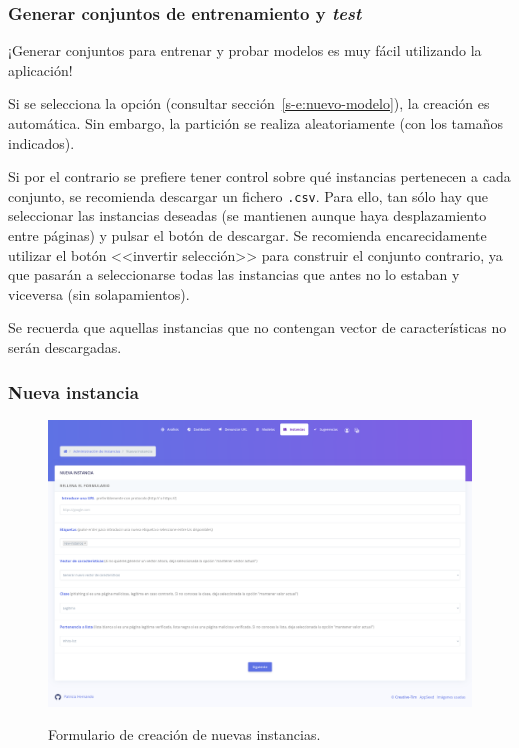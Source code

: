 \subsubsection{Generar conjuntos de entrenamiento y \textit{test}}

¡Generar conjuntos para entrenar y probar modelos es muy fácil utilizando la aplicación!

Si se selecciona la opción (consultar sección~\ref{s-e:nuevo-modelo}), la creación es automática. Sin embargo, la partición se realiza aleatoriamente (con los tamaños indicados).

Si por el contrario se prefiere tener control sobre qué instancias pertenecen a cada conjunto, se recomienda descargar un fichero \texttt{.csv}. Para ello, tan sólo hay que seleccionar las instancias deseadas (se mantienen aunque haya desplazamiento entre páginas) y pulsar el botón de descargar. Se recomienda encarecidamente utilizar el botón <<invertir selección>> para construir el conjunto contrario, ya que pasarán a seleccionarse todas las instancias que antes no lo estaban y viceversa (sin solapamientos).

Se recuerda que aquellas instancias que no contengan vector de características no serán descargadas.

\subsubsection{Nueva instancia}

\begin{figure}[h]
	\caption[Manual de usuario: nueva instancia]{Formulario de creación de nuevas instancias.}
	\centering
	\includegraphics[width=\textwidth]{../img/anexos/user_guide/6_new_instance}
	\label{e-5:new-instance}
\end{figure}

